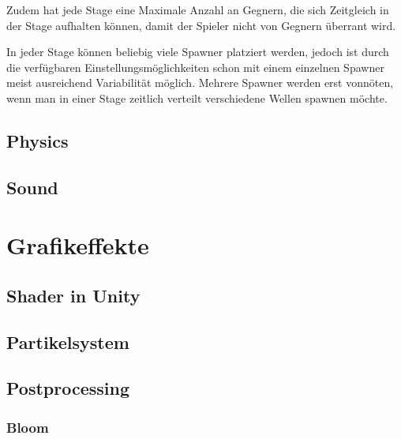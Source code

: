 \documentclass[a4paper,10pt,ngerman,fontsize=12pt]{scrreprt}
\begin{document}
Zudem hat jede Stage eine Maximale Anzahl an Gegnern, die sich Zeitgleich in der Stage aufhalten können, damit der Spieler nicht von Gegnern überrant wird.

In jeder Stage können beliebig viele Spawner platziert werden, jedoch ist durch die verfügbaren Einstellungsmöglichkeiten schon mit einem einzelnen Spawner meist ausreichend Variabilität möglich. Mehrere Spawner werden erst vonnöten, wenn man in einer Stage zeitlich verteilt verschiedene Wellen spawnen möchte.




\section{Physics}

\lipsum[3]



\section{Sound}

\lipsum[3]




\chapter{Grafikeffekte}




\section{Shader in Unity}

\lipsum[3]



\section{Partikelsystem}

\lipsum[3]



\section{Postprocessing}

\lipsum[3]



\subsection{Bloom}
\lipsum[3]
\end{document}
